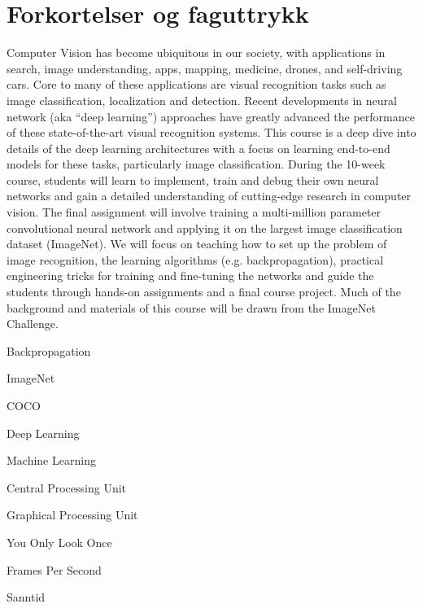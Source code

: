 \section*{Forkortelser og faguttrykk}

\begin{description}

\item[Maskinsyn] Computer Vision has become ubiquitous in our society, with applications in search, image understanding, apps, mapping, medicine, drones, and self-driving cars. Core to many of these applications are visual recognition tasks such as image classification, localization and detection. Recent developments in neural network (aka “deep learning”) approaches have greatly advanced the performance of these state-of-the-art visual recognition systems. This course is a deep dive into details of the deep learning architectures with a focus on learning end-to-end models for these tasks, particularly image classification. During the 10-week course, students will learn to implement, train and debug their own neural networks and gain a detailed understanding of cutting-edge research in computer vision. The final assignment will involve training a multi-million parameter convolutional neural network and applying it on the largest image classification dataset (ImageNet). We will focus on teaching how to set up the problem of image recognition, the learning algorithms (e.g. backpropagation), practical engineering tricks for training and fine-tuning the networks and guide the students through hands-on assignments and a final course project. Much of the background and materials of this course will be drawn from the ImageNet Challenge.
\item{Backpropagation}
\item{ImageNet}
\item{COCO}
\item{Deep Learning}
\item[ML] Machine Learning
\item[CPU] Central Processing Unit
\item[GPU] Graphical Processing Unit
\item[YOLO] You Only Look Once
\item[FPS] Frames Per Second
\item[State-of-the-art] 
\item[Real-time] Sanntid
\item[mAP] 
\item[Nøyaktighet] 
\item[Presisjon] 
\item[Modell] 
\item[Algoritme]


\end{description}